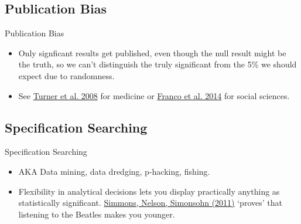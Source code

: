 \documentclass{beamer}
\begin{document}
\subsection{Publication Bias}
 \begin{frame}{Publication Bias}
  \begin{itemize}
  \item
  Only signficant results get published, even though the null result might be the truth, so we can't distinguish the truly significant from the 5\% we should expect due to randomness.
  
  \item
  See \href{http://www.nejm.org/doi/full/10.1056/NEJMsa065779}{Turner et al. 2008} for medicine or \href{http://www.sciencemag.org/content/345/6203/1502}{Franco et al. 2014} for social sciences. 
 \end{itemize}
 \end{frame}
 
{ %
    \begin{frame}[plain]
     \end{frame}
}

\subsection{Specification Searching}
 \begin{frame}{Specification Searching}
  \begin{itemize}
  \item
  AKA Data mining, data dredging, p-hacking, fishing.
  
  \item
  Flexibility in analytical decisions lets you display practically anything as statistically significant. \href{http://pss.sagepub.com/content/22/11/1359}{Simmons, Nelson, Simonsohn (2011)} `proves' that listening to the Beatles makes you younger.
  \end{itemize}
 \end{frame}
 
\end{document}
